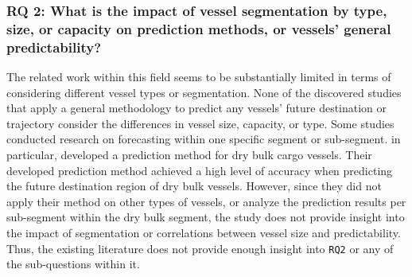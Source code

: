 \subsubsection{RQ 2: What is the impact of vessel segmentation by type, size, or capacity on prediction methods, or vessels' general predictability?}

The related work within this field seems to be substantially limited in terms of considering different vessel types or segmentation. None of the discovered studies that apply a general methodology to predict any vessels' future destination or trajectory consider the differences in vessel size, capacity, or type. Some studies conducted research on forecasting within one specific segment or sub-segment. \cite{lechtenberg2019} in particular, developed a prediction method for dry bulk cargo vessels. Their developed prediction method achieved a high level of accuracy when predicting the future destination region of dry bulk vessels. However, since they did not apply their method on other types of vessels, or analyze the prediction results per sub-segment within the dry bulk segment, the study does not provide insight into the impact of segmentation or correlations between vessel size and predictability. Thus, the existing literature does not provide enough insight into \texttt{RQ2} or any of the sub-questions within it.



